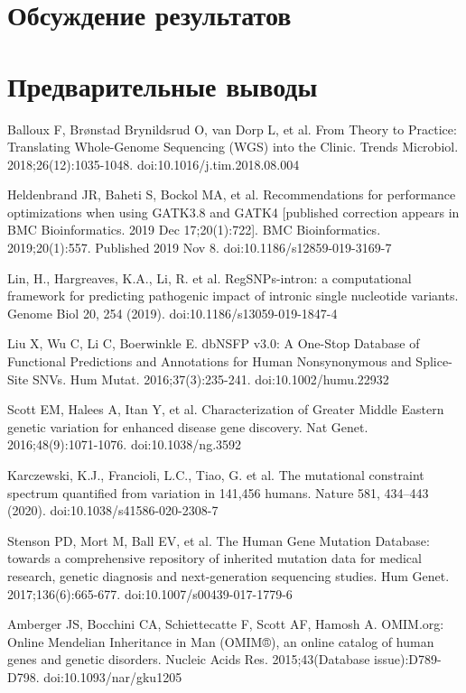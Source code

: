 \documentclass[a4paper,12pt]{article}
\begin{document}
\section{Обсуждение результатов}

\section{Предварительные выводы}

\begin{thebibliography}{100}

Balloux F, Brønstad Brynildsrud O, van Dorp L, et al. From Theory to Practice: Translating Whole-Genome Sequencing (WGS) into the Clinic. Trends Microbiol. 2018;26(12):1035-1048. doi:10.1016/j.tim.2018.08.004

Heldenbrand JR, Baheti S, Bockol MA, et al. Recommendations for performance optimizations when using GATK3.8 and GATK4 [published correction appears in BMC Bioinformatics. 2019 Dec 17;20(1):722]. BMC Bioinformatics. 2019;20(1):557. Published 2019 Nov 8. doi:10.1186/s12859-019-3169-7

Lin, H., Hargreaves, K.A., Li, R. et al. RegSNPs-intron: a computational framework for predicting pathogenic impact of intronic single nucleotide variants. Genome Biol 20, 254 (2019). doi:10.1186/s13059-019-1847-4

Liu X, Wu C, Li C, Boerwinkle E. dbNSFP v3.0: A One-Stop Database of Functional Predictions and Annotations for Human Nonsynonymous and Splice-Site SNVs. Hum Mutat. 2016;37(3):235-241. doi:10.1002/humu.22932

Scott EM, Halees A, Itan Y, et al. Characterization of Greater Middle Eastern genetic variation for enhanced disease gene discovery. Nat Genet. 2016;48(9):1071-1076. doi:10.1038/ng.3592

Karczewski, K.J., Francioli, L.C., Tiao, G. et al. The mutational constraint spectrum quantified from variation in 141,456 humans. Nature 581, 434–443 (2020). doi:10.1038/s41586-020-2308-7

Stenson PD, Mort M, Ball EV, et al. The Human Gene Mutation Database: towards a comprehensive repository of inherited mutation data for medical research, genetic diagnosis and next-generation sequencing studies. Hum Genet. 2017;136(6):665-677. doi:10.1007/s00439-017-1779-6

Amberger JS, Bocchini CA, Schiettecatte F, Scott AF, Hamosh A. OMIM.org: Online Mendelian Inheritance in Man (OMIM®), an online catalog of human genes and genetic disorders. Nucleic Acids Res. 2015;43(Database issue):D789-D798. doi:10.1093/nar/gku1205


\end{thebibliography}
\end{document}
